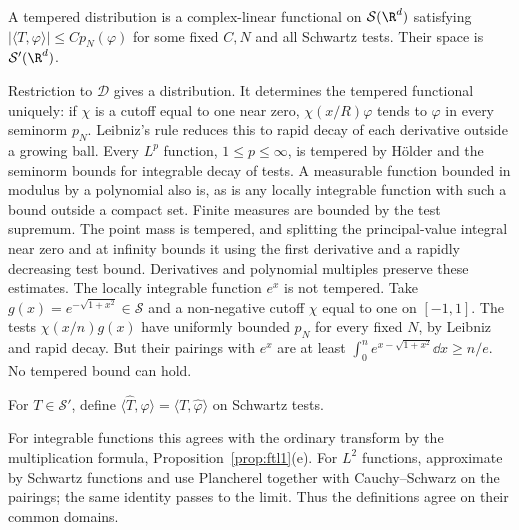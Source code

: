 \begin{definition}
A tempered distribution is a complex-linear functional on $\mathcal S(\R^d)$ satisfying $|\langle T,\varphi\rangle|\le Cp_N(\varphi)$ for some fixed $C,N$ and all Schwartz tests. Their space is $\mathcal S'(\R^d)$.
\end{definition}

Restriction to $\mathcal D$ gives a distribution. It determines the tempered functional uniquely: if $\chi$ is a cutoff equal to one near zero, $\chi(x/R)\varphi$ tends to $\varphi$ in every seminorm $p_N$. Leibniz's rule reduces this to rapid decay of each derivative outside a growing ball.
Every $L^p$ function, $1\le p\le\infty$, is tempered by H\"older and the seminorm bounds for integrable decay of tests. A measurable function bounded in modulus by a polynomial also is, as is any locally integrable function with such a bound outside a compact set. Finite measures are bounded by the test supremum. The point mass is tempered, and splitting the principal-value integral near zero and at infinity bounds it using the first derivative and a rapidly decreasing test bound. Derivatives and polynomial multiples preserve these estimates.
The locally integrable function $e^x$ is not tempered. Take $g(x)=e^{-\sqrt{1+x^2}}\in\mathcal S$ and a non-negative cutoff $\chi$ equal to one on $[-1,1]$. The tests $\chi(x/n)g(x)$ have uniformly bounded $p_N$ for every fixed $N$, by Leibniz and rapid decay. But their pairings with $e^x$ are at least $\int_0^ne^{x-\sqrt{1+x^2}}\dd x\ge n/e$. No tempered bound can hold.

\begin{definition}
For $T\in\mathcal S'$, define $\langle\hat T,\varphi\rangle=\langle T,\hat\varphi\rangle$ on Schwartz tests.
\end{definition}

For integrable functions this agrees with the ordinary transform by the multiplication formula, Proposition~\ref{prop:ftl1}(e). For $L^2$ functions, approximate by Schwartz functions and use Plancherel together with Cauchy--Schwarz on the pairings; the same identity passes to the limit. Thus the definitions agree on their common domains.

